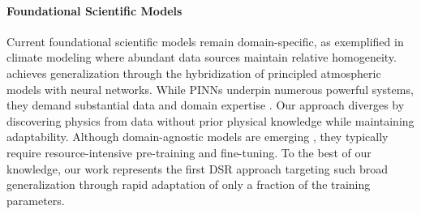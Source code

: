 \paragraph{Foundational Scientific Models} Current foundational scientific models remain domain-specific, as exemplified in climate modeling \cite{nguyen2023climax,bodnar2024aurora} where abundant data sources maintain relative homogeneity. \citet{kochkov2024neural} achieves generalization through the hybridization of principled atmospheric models with neural networks. While PINNs \cite{cuomo2022scientific} underpin numerous powerful systems, they demand substantial data and domain expertise \cite{nzoyem2023comparison}. Our approach diverges by discovering physics from data without prior physical knowledge while maintaining adaptability. Although domain-agnostic models are emerging \cite{subramanian2024towards,herde2024poseidon}, they typically require resource-intensive pre-training and fine-tuning. To the best of our knowledge, our work represents the first DSR approach targeting such broad generalization through rapid adaptation of only a fraction of the training parameters.









